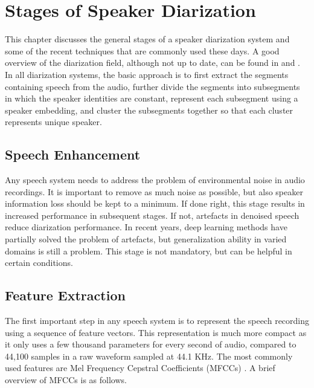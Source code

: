 \chapter{Stages of Speaker Diarization}
This chapter discusses the general stages of a speaker diarization system and some of the recent techniques that are commonly used these days. A good overview of the diarization field, although not up to date, can be found in \cite{anguera2012speaker} and \cite{1677976}. In all diarization systems, the basic approach is to first extract the segments containing speech from the audio, further divide the segments into subsegments in which the speaker identities are constant, represent each subsegment using a speaker embedding, and cluster the subsegments together so that each cluster represents unique speaker.

\section{Speech Enhancement}
Any speech system needs to address the problem of environmental noise in audio recordings. It is important to remove as much noise as possible, but also speaker information loss should be kept to a minimum. If done right, this stage results in increased performance in subsequent stages. If not, artefacts in denoised speech reduce diarization performance. In recent years, deep learning methods have partially solved the problem of artefacts, but generalization ability in varied domains is still a problem. This stage is not mandatory, but can be helpful in certain conditions.

\section{Feature Extraction}
The first important step in any speech system is to represent the speech recording using a sequence of feature vectors. This representation is much more compact as it only uses a few thousand parameters for every second of audio, compared to 44,100 samples in a raw waveform sampled at 44.1 KHz. The most commonly used features are Mel Frequency Cepstral Coefficients (MFCCs) \cite{logan2000mel}. A brief overview of MFCCs is as follows.

